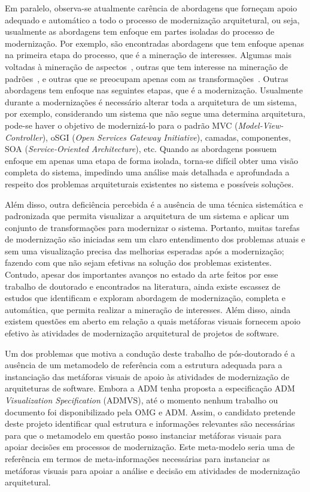 \documentclass[12pt]{article}
\begin{document}
Em paralelo, observa-se atualmente carência de abordagens que forneçam apoio adequado e automático a todo o processo de modernização arquitetural, ou seja, usualmente as abordagens tem enfoque em partes isoladas do processo de modernização. Por exemplo, são encontradas abordagens que tem enfoque apenas na primeira etapa do processo, que é a mineração de interesses. Algumas mais voltadas à mineração de aspectos~\cite{...}, outras que tem interesse na mineração de padrões~\cite{}, e outras que se preocupam apenas com as transformações~\cite{}. Outras abordagens tem enfoque nas seguintes etapas, que é a modernização. Usualmente durante a modernizações é necessário alterar toda a arquitetura de um sistema, por exemplo, considerando um sistema que não segue uma determina arquitetura, pode-se haver o objetivo de modernizá-lo para o padrão MVC (\textit{Model-View-Controller}), oSGI (\textit{Open Services Gateway Initiative}), camadas, componentes, SOA (\textit{Service-Oriented Architecture}), etc. Quando as abordagens possuem enfoque em apenas uma etapa de forma isolada, torna-se difícil obter uma visão completa do sistema, impedindo uma análise mais detalhada e aprofundada a respeito dos problemas arquiteturais existentes no sistema e possíveis soluções.

Além disso, outra deficiência percebida é a ausência de uma técnica sistemática e padronizada que permita visualizar a arquitetura de um sistema e aplicar um conjunto de transformações para modernizar o sistema. Portanto, muitas tarefas de modernização são iniciadas sem um claro entendimento dos problemas atuais e sem uma visualização precisa das melhorias esperadas após a modernização; fazendo com que não sejam efetivas na solução dos problemas existentes. Contudo, apesar dos importantes avanços no estado da arte feitos por esse trabalho de doutorado e encontrados na literatura, ainda existe escassez de estudos que identificam e exploram abordagem de modernização, completa e automática, que permita realizar a mineração de interesses. Além disso, ainda existem questões em aberto em relação a quais metáforas visuais fornecem apoio efetivo às atividades de modernização arquitetural de projetos de software.  

Um dos problemas que motiva a condução deste trabalho de pós-doutorado é a ausência de um metamodelo de referência com a estrutura adequada para a instanciação das metáforas visuais de apoio às atividades de modernização de arquiteturas de software. Embora a ADM tenha proposta a especificação ADM \textit{Visualization Specification} (ADMVS), até o momento nenhum trabalho ou documento foi disponibilizado pela OMG e ADM. Assim, o candidato pretende deste projeto identificar qual estrutura e informações relevantes são necessárias para que o metamodelo em questão posso instanciar metáforas visuais para apoiar decisões em processos de modernização. Este meta-modelo seria uma de referência em termos de meta-informações necessárias para instanciar as metáforas visuais para apoiar a análise e decisão em atividades de modernização arquitetural. 
\end{document}
